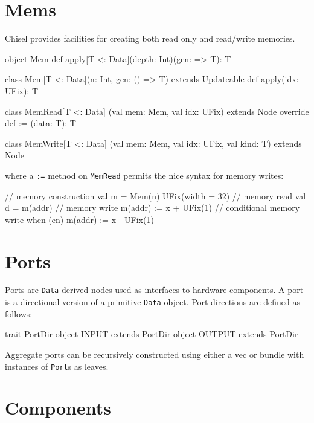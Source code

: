 \documentclass[10pt,twocolumn]{article}
\def\code#1{{\small\tt #1}}
\begin{document}
\section{Mems}

Chisel provides facilities for creating both read only and
read/write memories.  

\begin{scala}
object Mem {
  def apply[T <: Data](depth: Int)(gen: => T): T
}

class Mem[T <: Data](n: Int, gen: () => T) 
    extends Updateable {
  def apply(idx: UFix): T
}

class MemRead[T <: Data]
      (val mem: Mem, val idx: UFix) extends Node {
  override def := (data: T): T
}

class MemWrite[T <: Data]
      (val mem: Mem, val idx: UFix, val kind: T) 
    extends Node
\end{scala}

\noindent
where a \code{:=} method on \code{MemRead} permits the nice syntax for
memory writes:

\begin{scala}
// memory construction
val m = Mem(n){ UFix(width = 32) }
// memory read
val d = m(addr)
// memory write
m(addr) := x + UFix(1)
// conditional memory write
when (en) {
  m(addr) := x - UFix(1)
}
\end{scala}


\section{Ports}
\label{sec:ports}

Ports are \code{Data} derived nodes used as interfaces to hardware
components.   A port is a directional version of a primitive
\code{Data} object.  Port directions are defined as follows:

\begin{scala}
trait PortDir
object INPUT  extends PortDir
object OUTPUT extends PortDir
\end{scala}

\noindent
Aggregate ports can be recursively constructed using either a vec or
bundle with instances of \code{Port}s as leaves.  

\section{Components}
\end{document}
